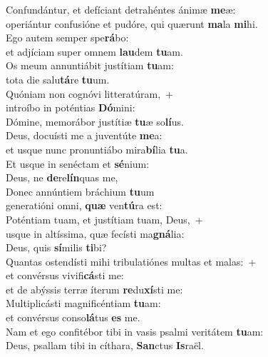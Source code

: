 \evenverse Confundántur, et defíciant detrahéntes ánimæ \textbf{me}æ:~\*\\
\evenverse operiántur confusióne et pudóre, qui quærunt \textbf{ma}la \textbf{mi}hi.\\
\oddverse Ego autem semper spe\textbf{rá}bo:~\*\\
\oddverse et adjíciam super omnem \textbf{lau}dem \textbf{tu}am.\\
\evenverse Os meum annuntiábit justítiam \textbf{tu}am:~\*\\
\evenverse tota die salu\textbf{tá}re \textbf{tu}um.\\
\oddverse Quóniam non cognóvi litteratúram,~+\\
\oddverse  introíbo in poténtias \textbf{Dó}mini:~\*\\
\oddverse Dómine, memorábor justítiæ \textbf{tu}æ so\textbf{lí}us.\\
\evenverse Deus, docuísti me a juventúte \textbf{me}a:~\*\\
\evenverse et usque nunc pronuntiábo mira\textbf{bí}lia \textbf{tu}a.\\
\oddverse Et usque in senéctam et \textbf{sé}nium:~\*\\
\oddverse Deus, ne \textbf{de}re\textbf{lín}quas me,\\
\evenverse Donec annúntiem bráchium \textbf{tu}um~\*\\
\evenverse generatióni omni, \textbf{quæ} ven\textbf{tú}ra est:\\
\oddverse Poténtiam tuam, et justítiam tuam, Deus,~+\\
\oddverse  usque in altíssima, quæ fecísti ma\textbf{gná}lia:~\*\\
\oddverse Deus, quis \textbf{sí}milis \textbf{ti}bi?\\
\evenverse Quantas ostendísti mihi tribulatiónes multas et malas:~+\\
\evenverse  et convérsus vivifi\textbf{cá}sti me:~\*\\
\evenverse et de abýssis terræ íterum \textbf{re}du\textbf{xí}sti me:\\
\oddverse Multiplicásti magnificéntiam \textbf{tu}am:~\*\\
\oddverse et convérsus conso\textbf{lá}tus \textbf{es} me.\\
\evenverse Nam et ego confitébor tibi in vasis psalmi veritátem \textbf{tu}am:~\*\\
\evenverse Deus, psallam tibi in cíthara, \textbf{San}ctus \textbf{Is}raël.\\
